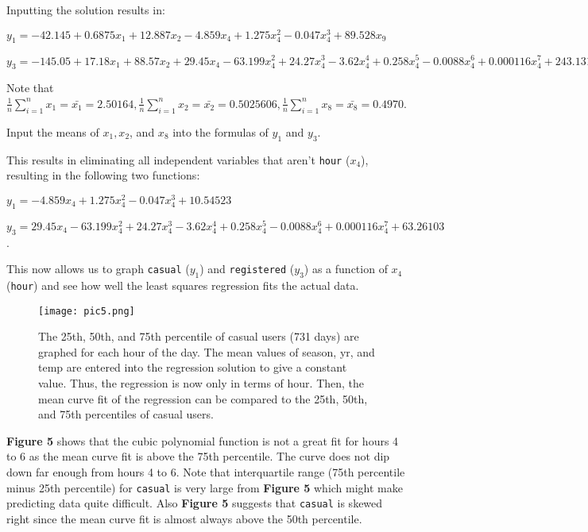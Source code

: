 \documentclass[
]{article}
\begin{document}
Inputting the solution results in:

\(y_{1} = -42.145 + 0.6875x_{1} + 12.887x_{2} - 4.859x_{4} + 1.275x_{4}^{2} - 0.047x_{4}^{3} + 89.528x_{9}\)

\(y_{3} = -145.05 + 17.18x_{1} + 88.57x_{2} + 29.45x_{4} - 63.199x_{4}^{2} + 24.27x_{4}^{3} - 3.62x_{4}^{4} + 0.258x_{4}^{5} - 0.0088x_{4}^{6} + 0.000116x_{4}^{7} + 243.131x_{9}\)

Note that
\(\frac{1}{n}\sum_{i=1}^{n} x_{1} = \bar{x_{1}} = 2.50164, \frac{1}{n}\sum_{i=1}^{n} x_{2} = \bar{x_{2}} = 0.5025606, \frac{1}{n}\sum_{i=1}^{n} x_{8} = \bar{x_{8}} = 0.4970\).

Input the means of \(x_{1}, x_{2}\), and \(x_{8}\) into the formulas of
\(y_{1}\) and \(y_{3}\).

This results in eliminating all independent variables that aren't
\texttt{hour} (\(x_{4}\)), resulting in the following two functions:

\(y_{1} = -4.859x_{4} + 1.275x_{4}^{2} -0.047x_{4}^{3} + 10.54523\)

\(y_{3} = 29.45x_{4} - 63.199x_{4}^{2} + 24.27x_{4}^{3} - 3.62x_{4}^{4} + 0.258x_{4}^{5} - 0.0088x_{4}^{6} + 0.000116x_{4}^{7} + 63.26103\).

This now allows us to graph \texttt{casual} (\(y_{1}\)) and
\texttt{registered} (\(y_{3}\)) as a function of \(x_{4}\)
(\texttt{hour}) and see how well the least squares regression fits the
actual data.

\newpage

\begin{figure}
\centering
\texttt{[image: pic5.png]}
\caption{The 25th, 50th, and 75th percentile of casual users (731 days)
are graphed for each hour of the day. The mean values of season, yr, and
temp are entered into the regression solution to give a constant value.
Thus, the regression is now only in terms of hour. Then, the mean curve
fit of the regression can be compared to the 25th, 50th, and 75th
percentiles of casual users.}
\end{figure}

\textbf{Figure 5} shows that the cubic polynomial function is not a great fit for hours 4 to 6 as the mean curve fit is above the 75th percentile. The curve does not dip down far enough from hours 4 to 6. Note that interquartile range (75th percentile minus 25th percentile) for \texttt{casual} is very large from \textbf{Figure 5} which might make predicting data quite difficult. Also \textbf{Figure 5} suggests that \texttt{casual} is skewed right since the mean curve fit is almost always above the 50th percentile.
\end{document}

